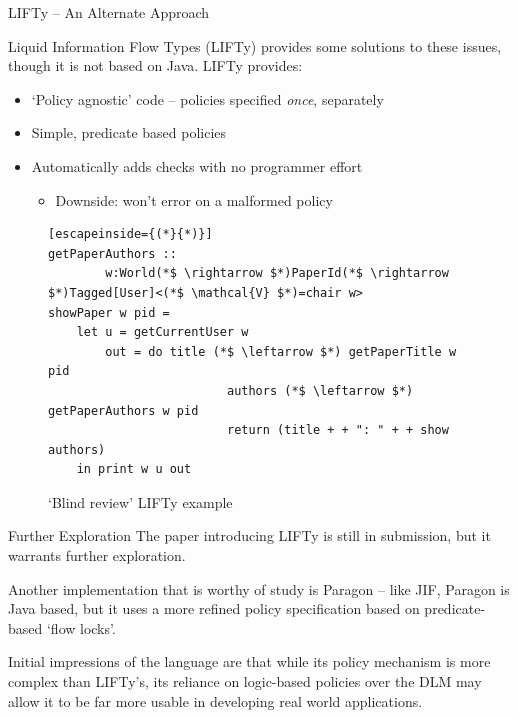 \begin{frame}[fragile]{LIFTy -- An Alternate Approach}
	
	Liquid Information Flow Types (LIFTy) provides some solutions to these issues, though it is not based on Java. LIFTy provides:
	
	\begin{itemize}
		\item `Policy agnostic' code -- policies specified \textit{once}, separately
		\item Simple, predicate based policies
		\item Automatically adds checks with no programmer effort
		\begin{itemize}
			\item Downside: won't error on a malformed policy
		\end{itemize}
	\end{itemize}
	
	\begin{figure}
		\begin{lstlisting}[escapeinside={(*}{*)}]
getPaperAuthors :: 
		w:World(*$ \rightarrow $*)PaperId(*$ \rightarrow $*)Tagged[User]<(*$ \mathcal{V} $*)=chair w>
showPaper w pid =
	let u = getCurrentUser w
		out = do title (*$ \leftarrow $*) getPaperTitle w pid
						 authors (*$ \leftarrow $*) getPaperAuthors w pid
						 return (title + + ": " + + show authors)
	in print w u out

		\end{lstlisting}
		\caption{`Blind review' LIFTy example \cite{work:lifty}}
	\end{figure}
	
	
\end{frame}

\begin{frame}{Further Exploration}
	The paper introducing LIFTy is still in submission, but it warrants further exploration.
	
	Another implementation that is worthy of study is Paragon -- like JIF, Paragon is Java based, but it uses a more refined policy specification based on predicate-based `flow locks'.
	
	Initial impressions of the language are that while its policy mechanism is more complex than LIFTy's, its reliance on logic-based policies over the DLM may allow it to be far more usable in developing real world applications.
\end{frame}

